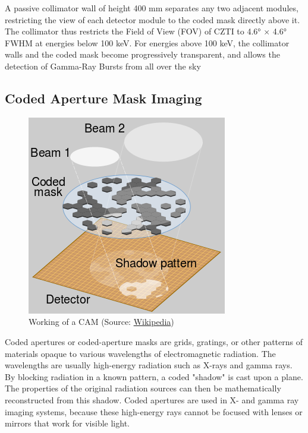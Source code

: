 \documentclass[11pt]{book} %
\begin{document}
A passive collimator wall of height 400 mm separates any two adjacent modules, restricting the view
of each detector module to the coded mask directly
above it. The collimator thus restricts the Field of View
(FOV) of CZTI to 4.6° × 4.6° FWHM at energies below
100 keV. For energies above 100 keV, the collimator
walls and the coded mask become progressively transparent, and allows the detection of Gamma-Ray Bursts
from all over the sky

\clearpage


\subsection{Coded Aperture Mask Imaging}


\begin{figure}
    \centering
    \includegraphics[scale=0.53]{Pictures/cam_working.png}
\caption{Working of a CAM (Source: \href{https://en.wikipedia.org/wiki/Coded_aperture}{Wikipedia})}
\end{figure}


Coded apertures or coded-aperture masks are grids, gratings, or other patterns of materials opaque to various wavelengths of electromagnetic radiation. The wavelengths are usually high-energy radiation such as X-rays and gamma rays. By blocking radiation in a known pattern, a coded "shadow" is cast upon a plane. The properties of the original radiation sources can then be mathematically reconstructed from this shadow. Coded apertures are used in X- and gamma ray imaging systems, because these high-energy rays cannot be focused with lenses or mirrors that work for visible light. 
\end{document}
